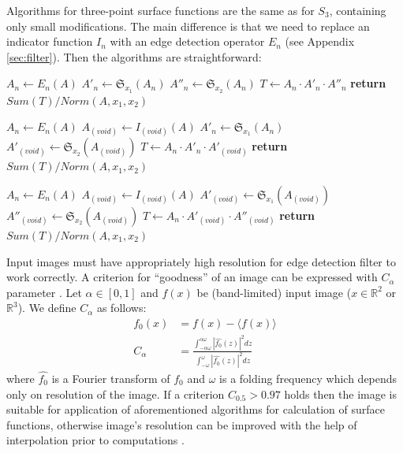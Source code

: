 \documentclass[reprint,amsmath,amssymb,aps,pre,showkeys,showpacs]{revtex4-1}
\begin{document}
Algorithms for three-point surface functions are the same as for $S_3$,
containing only small modifications. The main difference is that we need to
replace an indicator function $I_n$ with an edge detection operator $E_n$
(see Appendix \ref{sec:filter}). Then the algorithms are straightforward:
\begin{algorithmic}[1]
  \State $A_n \gets E_n (A)$
  \State $A'_n \gets \mathfrak{S}_{x_1}(A_n)$
  \State $A''_n \gets \mathfrak{S}_{x_2}(A_n)$
  \State $T \gets A_n \cdot A'_n \cdot A''_n$
  \State \textbf{return} $Sum(T) / Norm(A, x_1, x_2)$
  \EndProcedure

  \State $A_n \gets E_n (A)$
  \State $A_{(void)} \gets I_{(void)} (A)$
  \State $A'_n \gets \mathfrak{S}_{x_1}(A_n)$
  \State $A'_{(void)} \gets \mathfrak{S}_{x_2}(A_{(void)})$
  \State $T \gets A_n \cdot A'_n \cdot A'_{(void)}$
  \State \textbf{return} $Sum(T) / Norm(A, x_1, x_2)$
  \EndProcedure

  \State $A_n \gets E_n (A)$
  \State $A_{(void)} \gets I_{(void)} (A)$
  \State $A'_{(void)} \gets \mathfrak{S}_{x_1}(A_{(void)})$
  \State $A''_{(void)} \gets \mathfrak{S}_{x_2}(A_{(void)})$
  \State $T \gets A_n \cdot A'_{(void)} \cdot A''_{(void)}$
  \State \textbf{return} $Sum(T) / Norm(A, x_1, x_2)$
  \EndProcedure
\end{algorithmic}

Input images must have appropriately high resolution for edge detection filter
to work correctly. A criterion for ``goodness'' of an image can be expressed
with $C_{\alpha}$ parameter \cite{samarin2023robust}. Let $\alpha \in [0, 1]$
and $f(x)$ be (band-limited) input image ($x \in \mathbb{R}^2$ or
$\mathbb{R}^3$). We define $C_\alpha$ as follows:
\begin{equation}
  \begin{aligned}
    f_0(x) &= f(x) - \langle f(x) \rangle \\
    C_\alpha &= \frac{\int_{-\alpha\omega}^{\alpha\omega} |\hat{f_0}(z)|^2
      dz}{\int_{-\omega}^{\omega} |\hat{f_0}(z)|^2 dz}
  \end{aligned}
\end{equation}
where $\hat{f_0}$ is a Fourier transform of $f_0$ and $\omega$ is a folding
frequency which depends only on resolution of the image. If a criterion
$C_{0.5} > 0.97$ holds then the image is suitable for application of
aforementioned algorithms for calculation of surface functions, otherwise
image's resolution can be improved with the help of interpolation prior to
computations \cite{samarin2023robust}.
\end{document}
